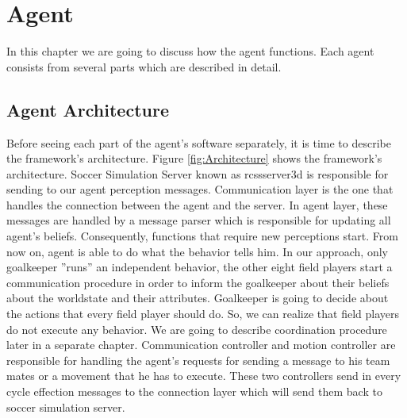 \chapter{Agent}
\label{Agent}
In this chapter we are going to discuss how the agent functions. Each agent consists from several parts which are described in detail.


\section{Agent Architecture}
Before seeing each part of the agent's software separately, it is time to describe the framework's architecture. Figure \ref{fig:Architecture}
shows the framework's architecture. Soccer Simulation Server known as rcssserver3d is responsible for sending to our agent perception messages. Communication layer is the one that handles the connection between the agent and the server. In agent layer, these messages are handled by a message parser which is responsible for updating all agent's beliefs. Consequently, functions that require new perceptions start. From now on, agent is able to do what the behavior tells him.
In our approach, only goalkeeper ''runs'' an independent behavior, the other eight field players start a communication procedure in order to inform the goalkeeper about their beliefs about the worldstate and their attributes. Goalkeeper is going to decide about the actions that every field player should do. So, we can realize that field players do not execute any behavior. We are going to describe coordination procedure later in a separate chapter.
Communication controller and motion controller are responsible for handling the agent's requests for sending a message to his team mates or a movement that he has to execute. These two controllers send in every cycle effection messages to the connection layer which will send them back to soccer simulation server.\\
